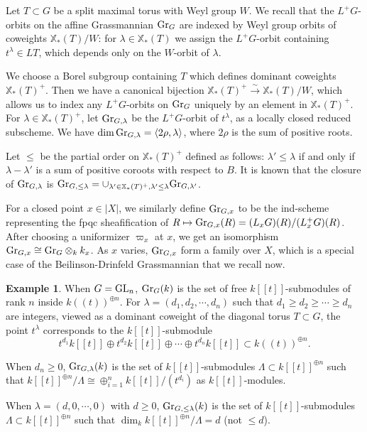 \documentclass[11pt]{amsart}
\numberwithin{equation}{section}
\theoremstyle{plain}
\theoremstyle{definition}
\newtheorem{exam}[subsubsection]{Example}
\newcommand{\Gr}{\textup{Gr}}
\newcommand\GL{\textup{GL}}
\newcommand\xcoch{\mathbb{X}_*}
\newcommand{\isom}{\stackrel{\sim}{\to}}
\renewcommand{\j}[1]{\langle{#1}\rangle}
\newcommand{\tl}[1]{[\![#1]\!]}
\newcommand{\lr}[1]{(\!(#1)\!)}
\newcommand\op{\oplus}
\newcommand\ot{\otimes}
\renewcommand\r\rho
\newcommand{\vp}{\varpi}
\renewcommand{\l}{\lambda}
\renewcommand{\L}{\Lambda}
\begin{document}
Let $T\subset G$ be a split maximal torus with Weyl group $W$.  We recall that the $L^{+}G$-orbits on the affine Grassmannian  $\Gr_{G}$ are indexed by Weyl group orbits of coweights $\xcoch(T)/W$: for $\l\in \xcoch(T)$ we assign the $L^{+}G$-orbit containing $t^{\l}\in LT$, which depends only on the $W$-orbit of $\l$. 

We choose a Borel subgroup containing $T$ which defines dominant coweights $\xcoch(T)^{+}$. Then we have a canonical bijection $\xcoch(T)^{+}\isom \xcoch(T)/W$, which allows us to index any $L^{+}G$-orbits on $\Gr_{G}$ uniquely by an element in $\xcoch(T)^{+}$. For $\l\in \xcoch(T)^{+}$, let $\Gr_{G, \l}$ be the $L^{+}G$-orbit of $t^{\l}$, as a locally closed reduced subscheme. We have $\dim\Gr_{G,\l}=\j{2\r,\l}$, where $2\r$ is the sum of positive roots. 

Let $\le$ be the partial order on $\xcoch(T)^{+}$ defined as follows: $\l'\le \l$ if and only if $\l-\l'$ is a sum of positive coroots with respect to $B$.  It is known that the closure of $\Gr_{G,\l}$ is $\Gr_{G,\le \l}=\cup_{\l'\in\xcoch(T)^{+}, \l'\le \l}\Gr_{G,\l'}$.


For a closed point $x\in |X|$, we similarly define $\Gr_{G,x}$ to be the ind-scheme representing the fpqc sheafification of $R\mapsto \Gr_{G,x}(R)=(L_{x}G)(R)/(L^{+}_{x}G)(R)$. After choosing a uniformizer $\vp_{x}$ at $x$, we get an isomorphism $\Gr_{G,x}\cong \Gr_{G}\ot_{k}k_{x}$. As $x$ varies, $\Gr_{G,x}$ form a family over $X$, which is a special case of the Beilinson-Drinfeld Grassmannian that we recall now.

\begin{exam} When $G=\GL_{n}$, $\Gr_{G}(k)$ is the set of free $k\tl{t}$-submodules of rank $n$ inside $k\lr{t}^{\op n}$. For $\l=(d_{1},d_{2},\cdots, d_{n})$ such that $d_{1}\ge d_{2}\ge\cdots \ge d_{n}$ are integers, viewed as a dominant coweight of the diagonal torus $T\subset G$, the point $t^{\l}$ corresponds to the $k\tl{t}$-submodule 
\begin{equation*}
t^{d_{1}}k\tl{t}\op t^{d_{2}}k\tl{t}\op\cdots\op t^{d_{n}}k\tl{t}\subset k\lr{t}^{\op n}.
\end{equation*}

When $d_{n}\ge0$, $\Gr_{G,\l}(k)$ is the set of $k\tl{t}$-submodules $\L\subset k\tl{t}^{\op n}$ such that $k\tl{t}^{\op n}/\L\cong \op_{i=1}^{n}k\tl{t}/(t^{d_{i}})$ as $k\tl{t}$-modules. 

When $\l=(d,0,\cdots, 0)$ with $d\ge0$, $\Gr_{G,\le\l}(k)$ is the set of $k\tl{t}$-submodules $\L\subset k\tl{t}^{\op n}$ such that $\dim_{k}k\tl{t}^{\op n}/\L=d$ (not $\le d$).
\end{exam}
\end{document}
